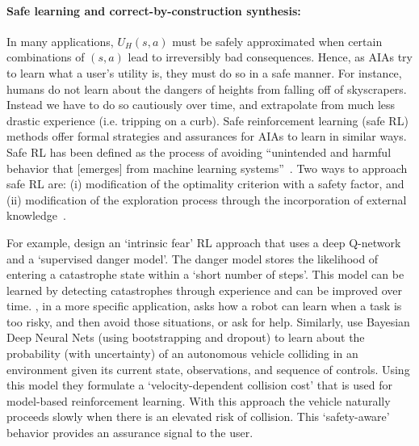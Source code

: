 \paragraph{Safe learning and correct-by-construction synthesis:}
In many applications, $U_H(s,a)$ must be safely approximated when certain combinations of $(s,a)$ lead to irreversibly bad consequences. 
Hence, as AIAs try to learn what a user's utility is, they must do so in a safe manner. 
For instance, humans do not learn about the dangers of heights from falling off of skyscrapers. 
Instead we have to do so cautiously over time, and extrapolate from much less drastic experience (i.e. tripping on a curb). 
Safe reinforcement learning (safe RL) methods offer formal strategies and assurances for AIAs to learn in similar ways.
Safe RL has been defined as the process of avoiding ``unintended and harmful behavior that [emerges] from machine learning systems''~\cite{Amodei2016-xi}. Two ways to approach safe RL are: (i) modification of the optimality criterion with a safety factor, and (ii) modification of the exploration process through the incorporation of external knowledge~\cite{Garcia2015-rs}. 

For example, \citet{Lipton2016-dq} design an `intrinsic fear' RL approach that uses a deep Q-network and a `supervised danger model'. The danger model stores the likelihood of entering a catastrophe state within a `short number of steps'. This model can be learned by detecting catastrophes through experience and can be improved over time. \citet{Curran2016-ij}, in a more specific application, asks how a robot can learn when a task is too risky, and then avoid those situations, or ask for help. 
Similarly, \citet{Kahn2017-vy} use Bayesian Deep Neural Nets (using bootstrapping and dropout) to learn about the probability (with uncertainty) of an autonomous vehicle colliding in an environment given its current state, observations, and sequence of controls. Using this model they formulate a `velocity-dependent collision cost' that is used for model-based reinforcement learning. With this approach the vehicle naturally proceeds slowly when there is an elevated risk of collision. This `safety-aware' behavior provides an assurance signal to the user. 

